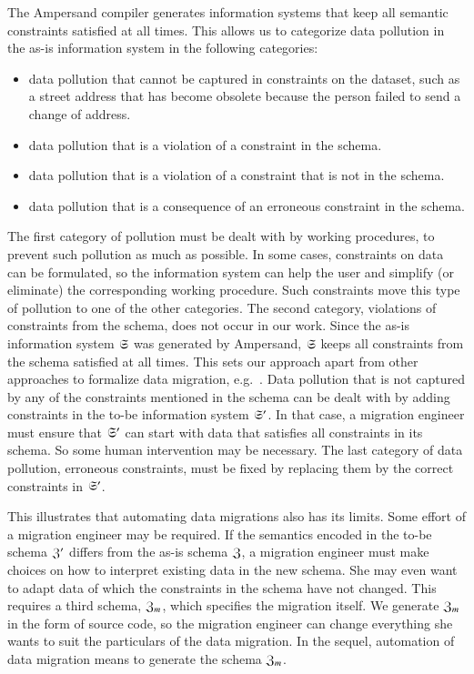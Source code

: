 \documentclass{elsarticle}
\begin{document}
   The Ampersand compiler generates information systems that keep all semantic constraints satisfied at all times.
   This allows us to categorize data pollution in the as-is information system in the following categories:
   \begin{itemize}
      \item data pollution that cannot be captured in constraints on the dataset,
      such as a street address that has become obsolete because the person failed to send a change of address.
      \item data pollution that is a violation of a constraint in the schema.
      \item data pollution that is a violation of a constraint that is not in the schema.
      \item data pollution that is a consequence of an erroneous constraint in the schema.
   \end{itemize}
   The first category of pollution must be dealt with by working procedures, to prevent such pollution as much as possible.
   In some cases, constraints on data can be formulated,
   so the information system can help the user and simplify (or eliminate) the corresponding working procedure.
   Such constraints move this type of pollution to one of the other categories.
   The second category, violations of constraints from the schema, does not occur in our work.
   Since the as-is information system $\mathfrak{S}$ was generated by Ampersand,
   $\mathfrak{S}$ keeps all constraints from the schema satisfied at all times.
   This sets our approach apart from other approaches to formalize data migration, e.g.~\cite{Thalheim2013}.
   Data pollution that is not captured by any of the constraints mentioned in the schema
   can be dealt with by adding constraints in the to-be information system $\mathfrak{S}'$.
   In that case, a migration engineer must ensure that $\mathfrak{S}'$ can start with data that satisfies all constraints in its schema.
   So some human intervention may be necessary.
   The last category of data pollution, erroneous constraints, must be fixed by replacing them by the correct constraints in $\mathfrak{S}'$.

   This illustrates that automating data migrations also has its limits.
   Some effort of a migration engineer may be required.
   If the semantics encoded in the to-be schema $\mathfrak{Z}'$ differs from the as-is schema $\mathfrak{Z}$,
   a migration engineer must make choices on how to interpret existing data in the new schema.
   She may even want to adapt data of which the constraints in the schema have not changed.
   This requires a third schema, $\mathfrak{Z}_m$, which specifies the migration itself.
   We generate $\mathfrak{Z}_m$ in the form of source code, so the migration engineer can change everything she wants to suit the particulars of the data migration.
   In the sequel, automation of data migration means to generate the schema $\mathfrak{Z}_m$.
\end{document}

